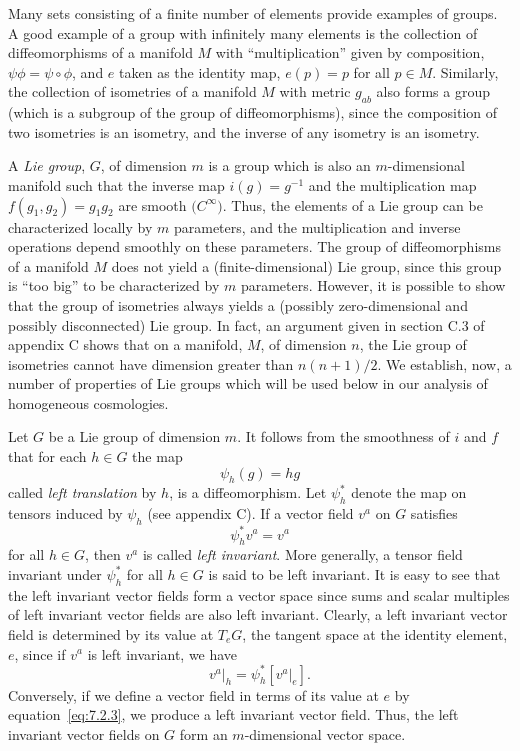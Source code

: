 Many sets consisting of a finite number of elements provide examples of groups. A
good example of a group with infinitely many elements is the collection of
diffeomorphisms of a manifold \(M\) with “multiplication” given by composition,
\(\psi\phi=\psi\circ\phi\), and \(e\) taken as the identity map,
\(e(p)=p\) for all \(p\in M\). Similarly, the collection of isometries of a
manifold \(M\) with metric \(g_{ab}\) also forms a group (which is a subgroup of the
group of diffeomorphisms), since the composition of two isometries is an isometry,
and the inverse of any isometry is an isometry.

A \emph{Lie group}, \(G\), of dimension \(m\) is a group which is also an
\(m\)-dimensional manifold such that the inverse map \(i(g)=g^{-1}\) and the
multiplication map \(f(g_1,g_2)=g_1g_2\) are smooth
\(\bigl(C^\infty\bigr)\). Thus, the elements of a Lie group can be characterized
locally by \(m\) parameters, and the multiplication and inverse operations depend
smoothly on these parameters. The group of diffeomorphisms of a manifold \(M\)
does not yield a (finite-dimensional) Lie group, since this group is “too big” to be
characterized by \(m\) parameters. However, it is possible to show that the group of
isometries always yields a (possibly zero-dimensional and possibly disconnected)
Lie group. In fact, an argument given in section C.3 of appendix C shows that on a
manifold, \(M\), of dimension \(n\), the Lie group of isometries cannot have
dimension greater than \(n(n+1)/2\). We establish, now, a number of properties of
Lie groups which will be used below in our analysis of homogeneous cosmologies.

Let \(G\) be a Lie group of dimension \(m\). It follows from the smoothness of \(i\)
and \(f\) that for each \(h\in G\) the map
\begin{equation}
  \psi_h(g)=hg
  \tag{7.2.1}\label{eq:7.2.1}
\end{equation}
called \emph{left translation} by \(h\), is a diffeomorphism. Let \(\psi_h^*\)
denote the map on tensors induced by \(\psi_h\) (see appendix C). If a vector field
\(v^a\) on \(G\) satisfies
\begin{equation}
  \psi_h^*v^a=v^a
  \tag{7.2.2}\label{eq:7.2.2}
\end{equation}
for all \(h\in G\), then \(v^a\) is called \emph{left invariant}. More generally, a
tensor field invariant under \(\psi_h^*\) for all \(h\in G\) is said to be left
invariant. It is easy to see that the left invariant vector fields form a vector space
since sums and scalar multiples of left invariant vector fields are also left invariant.
Clearly, a left invariant vector field is determined by its value at \(T_eG\), the
tangent space at the identity element, \(e\), since if \(v^a\) is left invariant, we
have
\begin{equation}
  \left.v^a\right|_h
    =\psi_h^*\!\left[\left.v^a\right|_e\right] .
  \tag{7.2.3}\label{eq:7.2.3}
\end{equation}
Conversely, if we define a vector field in terms of its value at \(e\) by
equation~\eqref{eq:7.2.3}, we produce a left invariant vector field. Thus, the left
invariant vector fields on \(G\) form an \(m\)-dimensional vector space.

